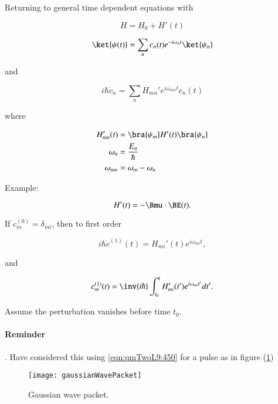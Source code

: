 Returning to general time dependent equations with

\begin{equation}\label{eqn:qmTwoL9:330}
H = H_0 + H'(t)
\end{equation}

\begin{equation}\label{eqn:qmTwoL9:350}
\ket{\psi(t)} = \sum_n c_n(t) e^{-i\omega_n t} \ket{\psi_n}
\end{equation}

and 

\begin{equation}\label{eqn:qmTwoL9:370}
i \hbar \dot{c}_n = \sum_n H_{mn}' e^{i \omega_{mn} t} c_n(t)
\end{equation}

where

\begin{align}\label{eqn:qmTwoL9:390}
H_{mn}'(t) &= \bra{\psi_m} H'(t) \bra{\psi_n} \\
\omega_n &= \frac{E_n}{\hbar} \\
\omega_{mn} &= \omega_m - \omega_n
\end{align}

Example:

\begin{equation}\label{eqn:qmTwoL9:410}
H'(t) = - \Bmu \cdot \BE(t).
\end{equation}

If $c_m^{(0)} = \delta_{mi}$, then to first order

\begin{equation}\label{eqn:qmTwoL9:430}
i \hbar \dot{c}^{(1)}(t) = H_{mi}'(t) e^{i \omega_{mi} t},
\end{equation}

and

\begin{equation}\label{eqn:qmTwoL9:450}
c_m^{(1)}(t) = \inv{i\hbar} \int_{t_0}^t H_{mi}'(t') e^{i \omega_{mi} t'} dt'.
\end{equation}

Assume the perturbation vanishes before time $t_0$.

\paragraph{Reminder}.  Have considered this using \ref{eqn:qmTwoL9:450} for a pulse as in figure (\ref{fig:gaussianWavePacket})

\begin{figure}[htp]
   \centering
   \texttt{[image: gaussianWavePacket]}
   \caption{Gaussian wave packet.}\label{fig:gaussianWavePacket}
\end{figure}

